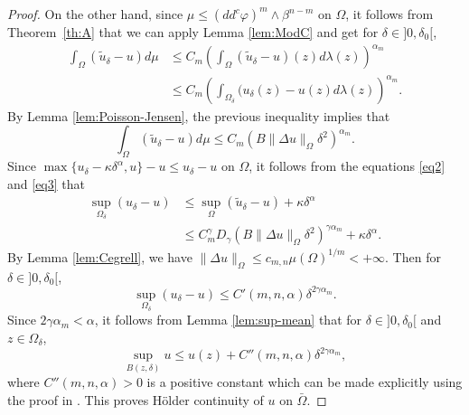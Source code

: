 \begin{proof}
On the other hand, since $\mu\leq (dd^c\varphi)^m\wedge\beta^{n-m}$ on $\Omega$, it follows from Theorem~\ref{th:A} that we can apply Lemma \ref{lem:ModC} and get for $\delta\in{}]0,\delta_0[$,
\begin{align*}
\int_{\Omega}(\tilde{u}_{\delta}-u)d\mu & \leq C_m \left(\int_{\Omega}(\tilde{u}_{\delta}-u)(z)d\lambda(z)\right)^{\alpha_m} \nonumber \\
&\leq C_m\left(\int_{\Omega_{\delta}}({u}_{\delta}(z)-u(z)d\lambda(z)\right)^{\alpha_m}.
\end{align*}
By Lemma \ref{lem:Poisson-Jensen}, the previous inequality implies that
\begin{equation} \label{eq3}
\int_{\Omega}(\tilde{u}_{\delta}-u)d\mu \leq C_m(B \|\Delta u\|_{\Omega}\delta^2)^{\alpha_m}.
\end{equation}
Since $ \max \{{u}_{\delta}- \kappa \delta^{\alpha},u\}-u\leq {u}_{\delta}-u$ on $\Omega$, it follows from the equations \eqref{eq2} and \eqref{eq3} that
\begin{align*}
\sup_{\Omega_{\delta}}( {u}_{\delta}-u)&\leq\sup_{\Omega}(\tilde{u}_{\delta}-u)+ \kappa \delta^{\alpha} \\
&\leq C_m^{\gamma} D_\gamma \left(B\|\Delta u\|_{\Omega}\delta^2\right)^{\gamma\alpha_m} + \kappa \delta^{\alpha}.
\end{align*}
By Lemma \ref{lem:Cegrell}, we have $\|\Delta u\|_{\Omega} \leq c_{m,n} \mu (\Omega)^{1 \slash m} < + \infty$. Then for $\delta\in{}]0,\delta_0[$,
\[
\sup_{\Omega_{\delta}}({u}_{\delta}-u)\leq C' (m,n,\alpha) \delta^{2 \gamma \alpha_m}.
\]
Since $2 \gamma \alpha_m < \alpha$, it follows from Lemma \ref{lem:sup-mean} that for $\delta\in{}]0,\delta_0[$ and $z \in \Omega_\delta$,
\[
\sup_{B (z,\delta)} u \leq u (z) + C'' (m,n,\alpha) \delta^{2 \gamma \alpha_m},
\]
where $C''(m,n,\alpha) > 0$ is a positive constant which can be made explicitly using the proof in \cite{GKZ08}.
This proves Hölder continuity of $u$ on $\bar \Omega$.
\end{proof}
